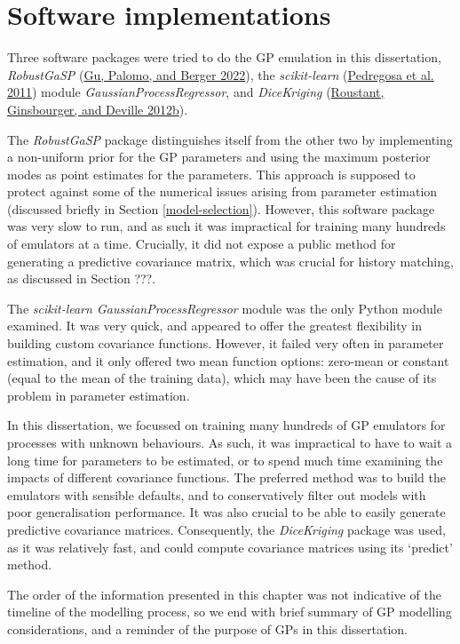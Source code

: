 \documentclass[
  12pt,
  a4paper,
  twoside]{book}
\begin{document}
\hypertarget{gp-software}{%
\section{Software implementations}\label{gp-software}}

Three software packages were tried to do the GP emulation in this dissertation, \emph{RobustGaSP} (\protect\hyperlink{ref-rgasp_manual}{Gu, Palomo, and Berger 2022}), the \emph{scikit-learn} (\protect\hyperlink{ref-scikit}{Pedregosa et al. 2011}) module \emph{GaussianProcessRegressor}, and \emph{DiceKriging} (\protect\hyperlink{ref-dice_r}{Roustant, Ginsbourger, and Deville 2012b}).

The \emph{RobustGaSP} package distinguishes itself from the other two by implementing a non-uniform prior for the GP parameters and using the maximum posterior modes as point estimates for the parameters. This approach is supposed to protect against some of the numerical issues arising from parameter estimation (discussed briefly in Section \ref{model-selection}). However, this software package was very slow to run, and as such it was impractical for training many hundreds of emulators at a time. Crucially, it did not expose a public method for generating a predictive covariance matrix, which was crucial for history matching, as discussed in Section ???.

The \emph{scikit-learn GaussianProcessRegressor} module was the only Python module examined. It was very quick, and appeared to offer the greatest flexibility in building custom covariance functions. However, it failed very often in parameter estimation, and it only offered two mean function options: zero-mean or constant (equal to the mean of the training data), which may have been the cause of its problem in parameter estimation.

In this dissertation, we focussed on training many hundreds of GP emulators for processes with unknown behaviours. As such, it was impractical to have to wait a long time for parameters to be estimated, or to spend much time examining the impacts of different covariance functions. The preferred method was to build the emulators with sensible defaults, and to conservatively filter out models with poor generalisation performance. It was also crucial to be able to easily generate predictive covariance matrices. Consequently, the \emph{DiceKriging} package was used, as it was relatively fast, and could compute covariance matrices using its `predict' method.

The order of the information presented in this chapter was not indicative of the timeline of the modelling process, so we end with brief summary of GP modelling considerations, and a reminder of the purpose of GPs in this dissertation.
\end{document}
